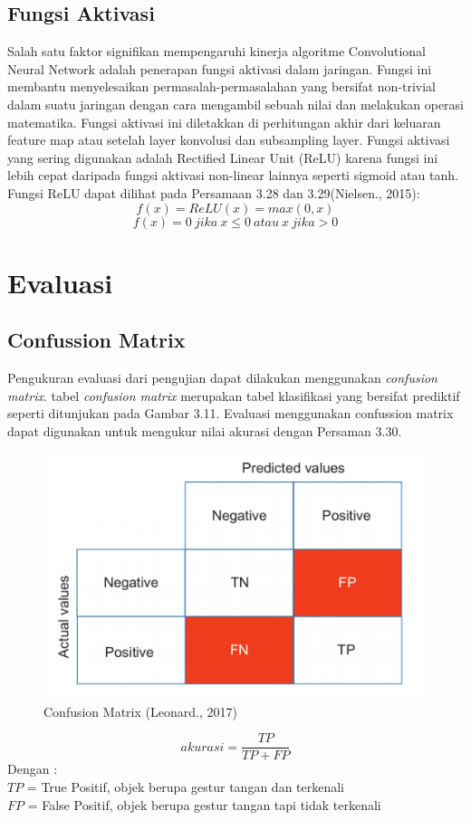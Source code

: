 \subsection{Fungsi Aktivasi}
Salah satu faktor signifikan mempengaruhi kinerja algoritme Convolutional Neural Network adalah penerapan fungsi aktivasi dalam jaringan. Fungsi ini membantu menyelesaikan permasalah-permasalahan yang bersifat non-trivial dalam suatu jaringan dengan cara mengambil sebuah nilai dan melakukan operasi matematika. Fungsi aktivasi ini diletakkan di perhitungan akhir dari keluaran feature map atau setelah layer konvolusi dan subsampling layer. Fungsi aktivasi yang sering digunakan adalah Rectified Linear Unit (ReLU) karena fungsi ini lebih cepat daripada fungsi aktivasi non-linear lainnya seperti sigmoid atau tanh. Fungsi ReLU dapat dilihat pada Persamaan 3.28 dan 3.29(Nielsen., 2015):
\begin{equation}
f(x) = ReLU(x) =max(0,x)
\end{equation}
\begin{equation}
	f(x)= 0 \ jika \ x \leq{0} \ atau \ x \ jika > 0
\end{equation}
\section{Evaluasi}
\subsection{Confussion Matrix}
Pengukuran evaluasi dari pengujian dapat dilakukan menggunakan \emph{confusion matrix}. tabel \emph{confusion matrix} merupakan tabel klasifikasi yang bersifat prediktif seperti ditunjukan pada Gambar 3.11. Evaluasi menggunakan confussion matrix dapat digunakan untuk mengukur nilai akurasi dengan Persaman 3.30.
\begin{figure}[H]
\centering
\includegraphics[width=0.7\linewidth]{confusion}
\caption{Confusion Matrix (Leonard., 2017)}
\label{fig:confusion}
\end{figure}
\begin{equation}
akurasi = \frac{TP}{TP+FP}
\end{equation}
Dengan :\\
$TP$ = True Positif, objek berupa gestur tangan dan terkenali\\
$FP$ = False Positif, objek berupa gestur tangan tapi tidak terkenali
